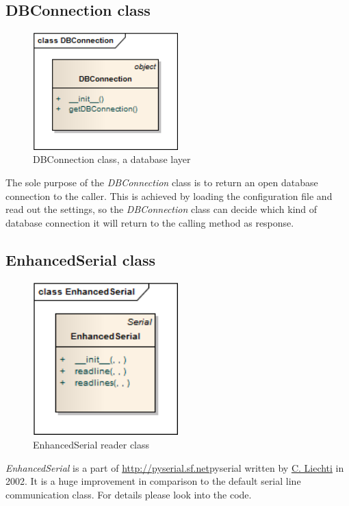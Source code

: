 \newpage
\subsection{DBConnection class}
\begin{figure}[H]
   \centering
   \includegraphics[width=0.5\textwidth]{pic/DBConnection.png}%
   \caption{DBConnection class, a database layer}
   \label{DBConnectionpic}%
\end{figure}

The sole purpose of the \textit{DBConnection} class is to return an open database connection to the caller. 
This is achieved by loading the configuration file and read out the settings, so the \textit{DBConnection} 
class can decide which kind of database connection it will return to the calling method as response.

\newpage
\subsection{EnhancedSerial class}
\begin{figure}[H]
   \centering
   \includegraphics[width=0.5\textwidth]{pic/EnhancedSerial.png}%
   \caption{EnhancedSerial reader class}
   \label{EnhancedSerialpic}%
\end{figure}

\textit{EnhancedSerial} is a part of \url{http://pyserial.sf.net}{pyserial}  written by \href{mailto:cliechti@gmx.net}{C. Liechti} in 2002.
It is a huge improvement in comparison to the default serial line communication class. For details please look into the code.


